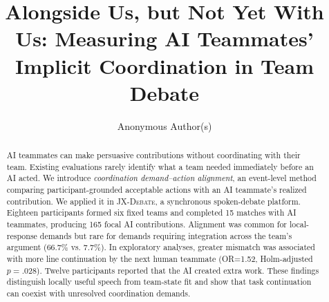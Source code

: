 \documentclass[manuscript,review,anonymous]{acmart}
\begin{document}
\title{Alongside Us, but Not Yet With Us: Measuring AI Teammates' Implicit Coordination in Team Debate}
\author{Anonymous Author(s)}
\renewcommand{\shortauthors}{Anonymous}

\begin{abstract}
AI teammates can make persuasive contributions without coordinating with their team. Existing evaluations rarely identify what a team needed immediately before an AI acted. We introduce \emph{coordination demand--action alignment}, an event-level method comparing participant-grounded acceptable actions with an AI teammate's realized contribution. We applied it in \textsc{JX-Debate}, a synchronous spoken-debate platform. Eighteen participants formed six fixed teams and completed 15 matches with AI teammates, producing 165 focal AI contributions. Alignment was common for local-response demands but rare for demands requiring integration across the team's argument (66.7\% vs. 7.7\%). In exploratory analyses, greater mismatch was associated with more line continuation by the next human teammate (OR=1.52, Holm-adjusted $p=.028$). Twelve participants reported that the AI created extra work. These findings distinguish locally useful speech from team-state fit and show that task continuation can coexist with unresolved coordination demands.
\end{abstract}

\maketitle
\end{document}
